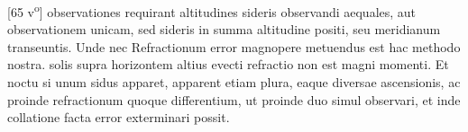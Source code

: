 [65 v\textsuperscript{o}] observationes requirant altitudines sideris\protect{} observandi aequales, aut observationem unicam, sed sideris\protect{} in summa altitudine positi, seu meridianum\protect{} transeuntis. Unde nec Refractionum\protect{} error magnopere metuendus est hac methodo nostra.   solis\protect{} supra horizontem altius evecti refractio\protect{} non est magni momenti. Et noctu si unum sidus apparet, apparent etiam plura, eaque diversae ascensionis, ac proinde refractionum\protect{} quoque differentium, ut proinde duo simul observari, et inde collatione facta error exterminari possit. \pend
